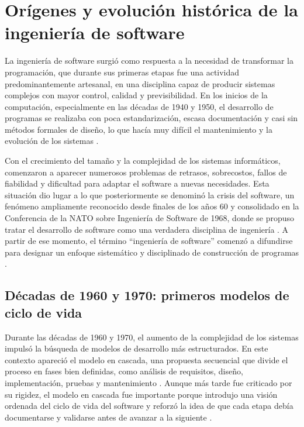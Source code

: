 \section{Orígenes y evolución histórica de la ingeniería de software}

La ingeniería de software surgió como respuesta a la necesidad de transformar la programación, que durante sus primeras etapas fue una actividad predominantemente artesanal, en una disciplina capaz de producir sistemas complejos con mayor control, calidad y previsibilidad. En los inicios de la computación, especialmente en las décadas de 1940 y 1950, el desarrollo de programas se realizaba con poca estandarización, escasa documentación y casi sin métodos formales de diseño, lo que hacía muy difícil el mantenimiento y la evolución de los sistemas \cite{sommerville2016}.

Con el crecimiento del tamaño y la complejidad de los sistemas informáticos, comenzaron a aparecer numerosos problemas de retrasos, sobrecostos, fallos de fiabilidad y dificultad para adaptar el software a nuevas necesidades. Esta situación dio lugar a lo que posteriormente se denominó la crisis del software, un fenómeno ampliamente reconocido desde finales de los años 60 y consolidado en la Conferencia de la NATO sobre Ingeniería de Software de 1968, donde se propuso tratar el desarrollo de software como una verdadera disciplina de ingeniería \cite{naur1969}. A partir de ese momento, el término ``ingeniería de software'' comenzó a difundirse para designar un enfoque sistemático y disciplinado de construcción de programas \cite{boehm1981}.

\subsection{Décadas de 1960 y 1970: primeros modelos de ciclo de vida}

Durante las décadas de 1960 y 1970, el aumento de la complejidad de los sistemas impulsó la búsqueda de modelos de desarrollo más estructurados. En este contexto apareció el modelo en cascada, una propuesta secuencial que divide el proceso en fases bien definidas, como análisis de requisitos, diseño, implementación, pruebas y mantenimiento \cite{royce1970}. Aunque más tarde fue criticado por su rigidez, el modelo en cascada fue importante porque introdujo una visión ordenada del ciclo de vida del software y reforzó la idea de que cada etapa debía documentarse y validarse antes de avanzar a la siguiente \cite{pressman2020}.

